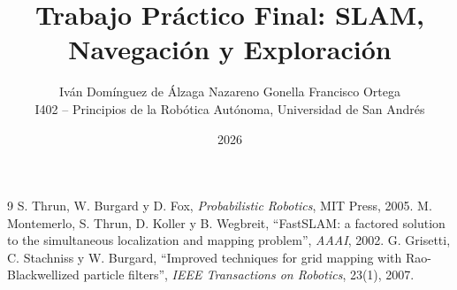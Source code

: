 \documentclass[10pt,twocolumn,a4paper]{article}
\title{Trabajo Práctico Final: SLAM, Navegación y Exploración}
\author{Iván Domínguez de Álzaga \quad Nazareno Gonella \quad Francisco Ortega\\[2pt]
  \small I402 -- Principios de la Robótica Autónoma, Universidad de San Andrés}
\date{2026}
\begin{document}
\maketitle





\begin{thebibliography}{9}\small
   S. Thrun, W. Burgard y D. Fox, \emph{Probabilistic Robotics}, MIT Press, 2005.
   M. Montemerlo, S. Thrun, D. Koller y B. Wegbreit, ``FastSLAM: a factored solution to the simultaneous localization and mapping problem'', \emph{AAAI}, 2002.
   G. Grisetti, C. Stachniss y W. Burgard, ``Improved techniques for grid mapping with Rao-Blackwellized particle filters'', \emph{IEEE Transactions on Robotics}, 23(1), 2007.
\end{thebibliography}
\end{document}
